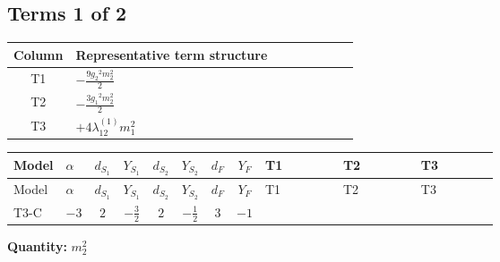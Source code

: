 \documentclass[8pt]{article}
\begin{document}
\begin{landscape}
\subsection*{Terms 1 of 2}
\begin{center}
\begin{tabular}{@{}c >{\raggedright\arraybackslash}p{0.82\linewidth}@{}}
\toprule
Column & Representative term structure \\
\midrule
T1 & \(\displaystyle -\frac{9 {g_2}^2 {m_2^2}}{2}\) \\
\midrule
T2 & \(\displaystyle -\frac{3 {g_1}^2 {m_2^2}}{2}\) \\
\midrule
T3 & \(\displaystyle +4 {\lambda_{12}^{(1)}} {m_1^2}\) \\
\midrule
\bottomrule
\end{tabular}
\end{center}
\smallskip
\tiny
\begin{longtable}{@{}llcccccc >{\raggedright\arraybackslash}p{0.21\linewidth} >{\raggedright\arraybackslash}p{0.21\linewidth} >{\raggedright\arraybackslash}p{0.21\linewidth}@{}}
\toprule
Model & $\alpha$ & $d_{S_1}$ & $Y_{S_1}$ & $d_{S_2}$ & $Y_{S_2}$ & $d_F$ & $Y_F$ & T1 & T2 & T3 \\
\midrule
\endfirsthead
\toprule
Model & $\alpha$ & $d_{S_1}$ & $Y_{S_1}$ & $d_{S_2}$ & $Y_{S_2}$ & $d_F$ & $Y_F$ & T1 & T2 & T3 \\
\midrule
\endhead
T3-C & $-3$ & $2$ & $-\frac{3}{2}$ & $2$ & $-\frac{1}{2}$ & $3$ & $-1$ & \scriptsize\adjustbox{max width=\linewidth}{$\begin{gathered} -\frac{9 {g_2}^2 {m_2^2}}{2}\end{gathered}$} & \scriptsize\adjustbox{max width=\linewidth}{$\begin{gathered} -\frac{3 {g_1}^2 {m_2^2}}{2}\end{gathered}$} & \scriptsize\adjustbox{max width=\linewidth}{$\begin{gathered} +4 {\lambda_{12}^{(1)}} {m_1^2}\end{gathered}$} \\
\midrule
\bottomrule
\end{longtable}
\clearpage
\noindent\textbf{Quantity: }$m_2^2$\par\smallskip

\end{landscape}
\end{document}
